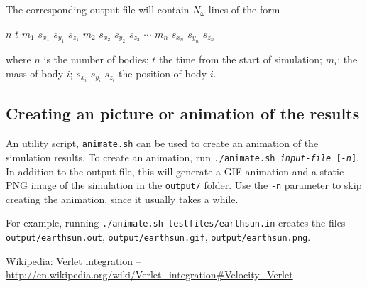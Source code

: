 \documentclass[a4paper]{article}
\begin{document}
   The corresponding output file will contain $N_\omega$ lines of the form
   \begin{center} $n$ $t$ $m_1$ $s_{x_1}$ $s_{y_1}$ $s_{z_1}$ $m_2$ $s_{x_2}$ $s_{y_2}$ $s_{z_2}$ $\cdots$ $m_n$ $s_{x_n}$ $s_{y_n}$ $s_{z_n}$\end{center}
   where $n$ is the number of bodies; $t$ the time from the start of simulation; $m_i$; the mass of body $i$;
   $s_{x_i}$ $s_{y_i}$ $s_{z_i}$ the position of body $i$.
   \subsection{Creating an picture or animation of the results}
   An utility script, \texttt{animate.sh} can be used to create an animation of the simulation results.
   To create an animation, run \texttt{./animate.sh \emph{input-file} [\emph{-n}]}.
   In addition to the output file, this will generate a GIF animation and a static PNG image of the simulation in the \texttt{output/} folder.
   Use the \texttt{-n} parameter to skip creating the animation, since it usually takes a while.

   For example, running \texttt{./animate.sh testfiles/earthsun.in} creates the files \texttt{output/earthsun.out},
   \texttt{output/earthsun.gif}, \texttt{output/earthsun.png}.


\begin{thebibliography}{9}
 Wikipedia: Verlet integration -- \url{http://en.wikipedia.org/wiki/Verlet_integration#Velocity_Verlet}
\end{thebibliography}
\end{document}

